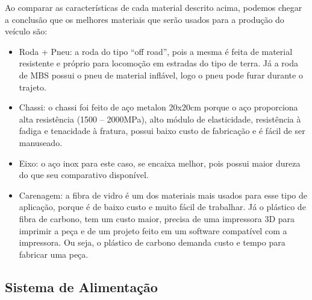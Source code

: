     \newpage

  Ao comparar as características de cada material descrito acima, podemos chegar a conclusão que os melhores materiais que
  serão usados para a produção do veículo são:

  \begin{itemize}
    \item Roda + Pneu: a roda do tipo “off road”, pois a mesma é feita de material resistente e próprio para locomoção em estradas do tipo de terra. Já a roda de MBS possui o pneu de material inflável, logo o pneu pode furar durante o trajeto.
    \item Chassi: o chassi foi feito de aço metalon 20x20cm porque o aço proporciona alta resistência (1500 – 2000MPa), alto módulo de elasticidade, resistência à fadiga e tenacidade à fratura, possui baixo custo de fabricação e é fácil de ser manuseado.
    \item Eixo: o aço inox para este caso, se encaixa melhor, pois possui maior dureza do que seu comparativo disponível.
    \item Carenagem: a fibra de vidro é um dos materiais mais usados para esse tipo de aplicação, porque é de baixo custo e muito fácil de trabalhar. Já o plástico de fibra de carbono, tem um custo maior, precisa de uma impressora 3D para imprimir a peça e de um projeto feito em um software compatível com a  impressora. Ou seja, o plástico de carbono demanda custo e tempo para fabricar uma peça.
  \end{itemize}


  \subsection{Sistema de Alimentação}

